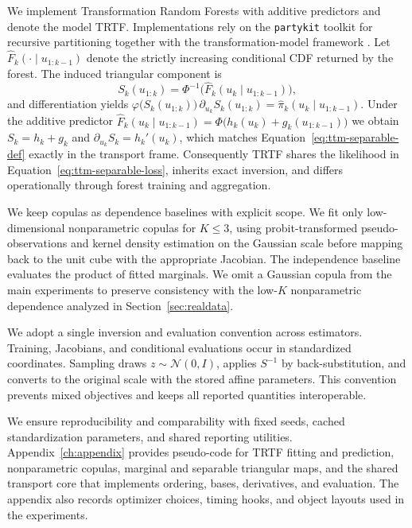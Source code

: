 \documentclass[11pt,a4paper,twoside]{book}\usepackage[]{graphicx}\usepackage[]{xcolor}
\begin{document}
We implement Transformation Random Forests with additive predictors and denote the model TRTF. Implementations rely on the \texttt{partykit} toolkit for recursive partitioning \citep{partykit2015} together with the transformation-model framework \citep{hothorn2017transformation,hothorn2018conditional}. Let $\widehat{F}_k(\cdot \mid u_{1:k-1})$ denote the strictly increasing conditional CDF returned by the forest. The induced triangular component is
\begin{equation}
  S_k(u_{1:k}) = \Phi^{-1}\!\big(\widehat{F}_k(u_k \mid u_{1:k-1})\big),
  \label{eq:trtf-transport}
\end{equation}
and differentiation yields $\varphi\big(S_k(u_{1:k})\big)\,\partial_{u_k} S_k(u_{1:k}) = \widehat{\pi}_k(u_k \mid u_{1:k-1})$. Under the additive predictor $\widehat{F}_k(u_k \mid u_{1:k-1}) = \Phi\big(h_k(u_k) + g_k(u_{1:k-1})\big)$ we obtain $S_k = h_k + g_k$ and $\partial_{u_k} S_k = h_k'(u_k)$, which matches Equation~\eqref{eq:ttm-separable-def} exactly in the transport frame. Consequently TRTF shares the likelihood in Equation~\eqref{eq:ttm-separable-loss}, inherits exact inversion, and differs operationally through forest training and aggregation.

We keep copulas as dependence baselines with explicit scope. We fit only low-dimensional nonparametric copulas for $K \le 3$, using probit-transformed pseudo-observations and kernel density estimation on the Gaussian scale before mapping back to the unit cube with the appropriate Jacobian. The independence baseline evaluates the product of fitted marginals. We omit a Gaussian copula from the main experiments to preserve consistency with the low-$K$ nonparametric dependence analyzed in Section~\ref{sec:realdata}.

We adopt a single inversion and evaluation convention across estimators. Training, Jacobians, and conditional evaluations occur in standardized coordinates. Sampling draws $z \sim \mathcal{N}(0, I)$, applies $S^{-1}$ by back-substitution, and converts to the original scale with the stored affine parameters. This convention prevents mixed objectives and keeps all reported quantities interoperable.

We ensure reproducibility and comparability with fixed seeds, cached standardization parameters, and shared reporting utilities. Appendix~\ref{ch:appendix} provides pseudo-code for TRTF fitting and prediction, nonparametric copulas, marginal and separable triangular maps, and the shared transport core that implements ordering, bases, derivatives, and evaluation. The appendix also records optimizer choices, timing hooks, and object layouts used in the experiments.
\end{document}
